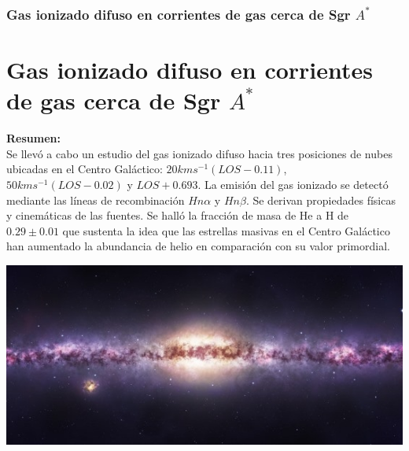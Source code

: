 \documentclass[8pt]{beamer}
\begin{document}
\begin{frame}
\frametitle{Gas ionizado difuso en corrientes de gas cerca de Sgr $A^*$}
\section{Gas ionizado difuso en corrientes de gas cerca de Sgr $A^*$}
\textbf{Resumen:}\\
Se llevó a cabo un estudio del gas ionizado difuso hacia tres posiciones de nubes ubicadas en el Centro Galáctico: $20kms^{-1}(LOS-0.11)$, $50kms^{-1}(LOS-0.02)$ y $LOS+0.693$. La emisión del gas ionizado se detectó mediante las líneas de recombinación $Hn\alpha$ y $Hn\beta$. Se derivan propiedades físicas y cinemáticas de las fuentes. Se halló la fracción de masa de He a H  de $0.29\pm 0.01$ que sustenta  la idea que las estrellas masivas en el Centro Galáctico han aumentado la abundancia de helio en comparación con su valor primordial.
\begin{center}
\includegraphics[width=0.6\linewidth]{figures/galactic_centre.jpg}
\end{center}
\end{frame}
\end{document}
